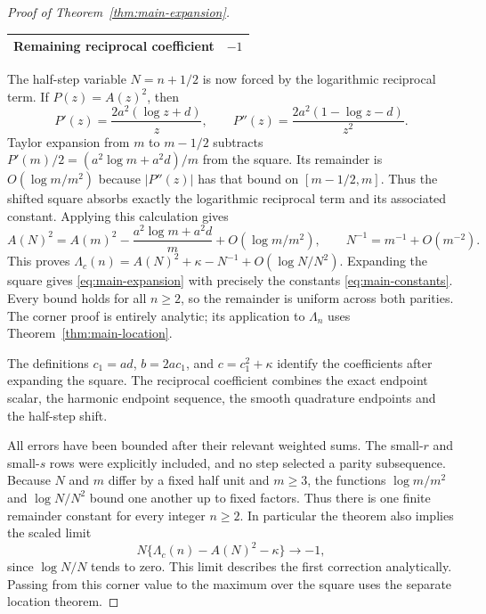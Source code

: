 \begin{proof}[Proof of Theorem~\ref{thm:main-expansion}]
\begin{center}
\begin{tabular}{ll}
Remaining reciprocal coefficient & $-1$\\
\bottomrule
\end{tabular}
\end{center}
The half-step variable $N=n+1/2$ is now forced by the logarithmic
reciprocal term. If $P(z)=A(z)^2$, then
\[
 P'(z)=\frac{2a^2(\log z+d)}{z},\qquad
 P''(z)=\frac{2a^2(1-\log z-d)}{z^2}.
\]
Taylor expansion from $m$ to $m-1/2$ subtracts
$P'(m)/2=(a^2\log m+a^2d)/m$ from the square. Its remainder
is $O(\log m/m^2)$ because $|P''(z)|$ has that bound on
$[m-1/2,m]$. Thus the shifted square absorbs exactly the
logarithmic reciprocal term and its associated constant. Applying
this calculation gives
\[
 A(N)^2=A(m)^2-\frac{a^2\log m+a^2d}{m}+O(\log m/m^2),
 \qquad N^{-1}=m^{-1}+O(m^{-2}).
\]
This proves $\Lambda_c(n)=A(N)^2+\kappa-N^{-1}+O(\log N/N^2)$.
Expanding the square gives \eqref{eq:main-expansion} with precisely the
constants \eqref{eq:main-constants}. Every bound holds for all $n\geq2$,
so the remainder is uniform across both parities. The corner proof is
entirely analytic; its application to $\Lambda_n$ uses
Theorem~\ref{thm:main-location}.

The definitions $c_1=ad$, $b=2ac_1$, and $c=c_1^2+\kappa$
identify the coefficients after expanding the square. The reciprocal
coefficient combines the exact endpoint scalar, the harmonic endpoint
sequence, the smooth quadrature endpoints and the half-step shift.

All errors have been bounded after their relevant weighted sums.
The small-$r$ and small-$s$ rows were explicitly included, and no
step selected a parity subsequence. Because $N$ and $m$ differ by
a fixed half unit and $m\geq3$, the functions
$\log m/m^2$ and $\log N/N^2$ bound one another up to fixed
factors. Thus there is one finite remainder constant for every
integer $n\geq2$. In particular the theorem also implies the
scaled limit
\[
 N\{\Lambda_c(n)-A(N)^2-\kappa\}\longrightarrow-1,
\]
since $\log N/N$ tends to zero. This limit describes the first
correction analytically. Passing from this corner value to the
maximum over the square uses the separate location theorem.
\end{proof}

